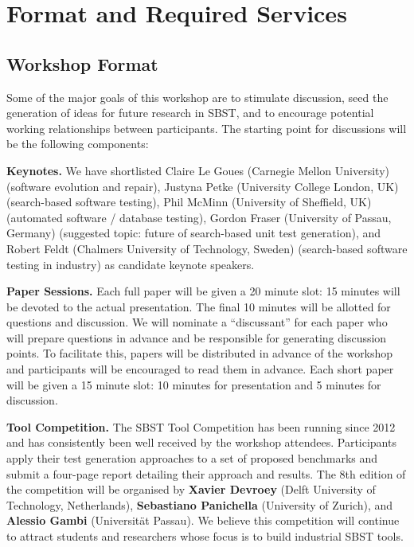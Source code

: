 \documentclass[10pt,conference]{IEEEtran}
\newcommand{\TODO}[1]{\textbf{\textcolor{ScarletRed}{[TODO: #1]}}\xspace}
\newcommand{\TODO}[1]{}
\begin{document}
\section{Format and Required Services}

\subsection{Workshop Format}

Some of the major goals of this workshop are to stimulate discussion,
seed the generation of ideas for future research in SBST, and to
encourage potential working relationships between participants.  The
starting point for discussions will be the following components:

{\bf Keynotes.}  We have shortlisted 
Claire Le Goues (Carnegie Mellon University) (software evolution and repair),
Justyna Petke (University College London, UK) (search-based software testing),
Phil McMinn (University of Sheffield, UK) (automated software / database testing),
Gordon Fraser (University of Passau, Germany) (suggested topic: future of search-based
unit test generation), 
and Robert Feldt (Chalmers University of Technology, Sweden) (search-based software testing in industry) 
as candidate keynote speakers. 

{\bf Paper Sessions.}  Each full paper will be given a 20
minute slot: 15 minutes will be devoted to the
actual presentation.  The final 10 minutes will be allotted for
questions and discussion.  We will nominate a ``discussant'' for each
paper who will prepare questions in advance and be responsible for
generating discussion points. To facilitate this, papers will be
distributed in advance of the workshop and participants will be
encouraged to read them in advance.  Each short paper will be given
a 15 minute slot: 10 minutes for presentation and 5 minutes for discussion.



\vspace{1mm} \noindent
{\bf Tool Competition.} The SBST Tool Competition has been running
since 2012 and has consistently been well received by the workshop
attendees. Participants apply their test generation approaches to a
set of proposed benchmarks and submit a four-page report detailing
their approach and results. The 8th edition of the competition will be
organised by {\bf Xavier Devroey} (Delft University of Technology, Netherlands),
{\bf Sebastiano Panichella} (University of Zurich),
and {\bf Alessio Gambi} (Universit{\"a}t Passau). We
believe this competition will continue to attract students and
researchers whose focus is to build industrial SBST tools.
\end{document}
